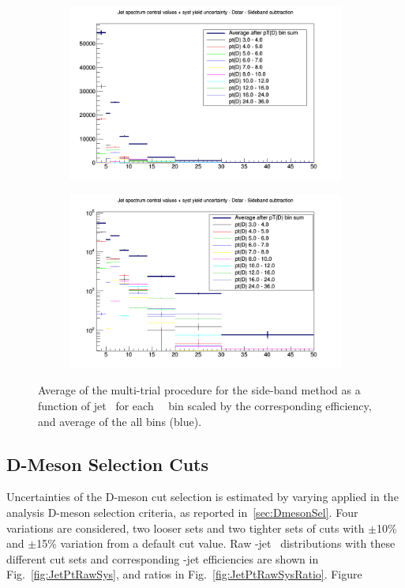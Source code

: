 \begin{figure}[bth]
\begin{center}
\begin{subfigure}[b]{.45\textwidth}
\includegraphics[width=\textwidth]{pPbplots/yieldExtraction/yieldInDbins}
\end{subfigure}
\begin{subfigure}[b]{.45\textwidth}
\includegraphics[width=\textwidth]{pPbplots/yieldExtraction/yieldInDbins_log}
\end{subfigure}
\caption{Average of the multi-trial procedure for the side-band method as a function of jet \pt\ for each \Dstar\ \pt\ bin scaled by the corresponding efficiency, and average of the all \Dstar \pt bins (blue).} 
\label{fig:MultiTrialSB_trials_pPB}
\end{center}
\end{figure}

\subsection{D-Meson Selection Cuts}
Uncertainties of the D-meson cut selection is estimated by varying applied in the analysis D-meson selection criteria, as reported in~\ref{sec:DmesonSel}. Four variations are considered, two looser sets and two tighter sets of cuts with $\pm$10\% and $\pm$15\% variation from a default cut value. Raw \Dstar-jet \pt\ distributions with these different cut sets and corresponding \Dstar-jet efficiencies are shown in Fig.~\ref{fig:JetPtRawSys}, and ratios in Fig.~\ref{fig:JetPtRawSysRatio}. Figure

